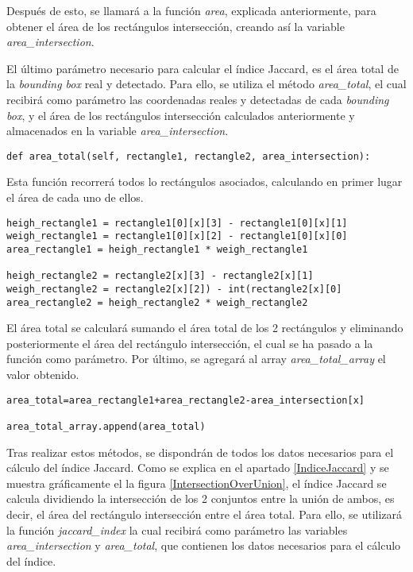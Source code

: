 \documentclass[a4paper, 12pt, oneside]{book}
\begin{document}
Después de esto, se llamará a la función \textit{area}, explicada anteriormente, para obtener el área de los rectángulos intersección, creando así la variable \textit{area\_intersection}.

El último parámetro necesario para calcular el índice Jaccard, es el área total de la \textit{bounding box} real y detectado. Para ello, se utiliza el método \textit{area\_total}, el cual recibirá como parámetro las coordenadas reales y detectadas de cada \textit{bounding box}, y el área de los rectángulos intersección calculados anteriormente y almacenados en la variable \textit{area\_intersection}.\\

\begin{lstlisting}[frame=single]
def area_total(self, rectangle1, rectangle2, area_intersection):
\end{lstlisting}

Esta función recorrerá todos lo rectángulos asociados, calculando en primer lugar el área de cada uno de ellos.\\

\begin{lstlisting}[frame=single]
heigh_rectangle1 = rectangle1[0][x][3] - rectangle1[0][x][1]
weigh_rectangle1 = rectangle1[0][x][2] - rectangle1[0][x][0]
area_rectangle1 = heigh_rectangle1 * weigh_rectangle1

heigh_rectangle2 = rectangle2[x][3] - rectangle2[x][1]
weigh_rectangle2 = rectangle2[x][2]) - int(rectangle2[x][0]
area_rectangle2 = heigh_rectangle2 * weigh_rectangle2
\end{lstlisting}

El área total se calculará sumando el área total de los 2 rectángulos y eliminando posteriormente el área del rectángulo intersección, el cual se ha pasado a la función como parámetro. Por último, se agregará al array \textit{area\_total\_array} el valor obtenido.\\

\begin{lstlisting}[frame=single]
area_total=area_rectangle1+area_rectangle2-area_intersection[x]

area_total_array.append(area_total)
\end{lstlisting}

Tras realizar estos métodos, se dispondrán de todos los datos necesarios para el cálculo del índice Jaccard. Como se explica en el apartado \ref{IndiceJaccard} y se muestra gráficamente el la figura \ref{IntersectionOverUnion}, el índice Jaccard se calcula dividiendo la intersección de los 2 conjuntos entre la unión de ambos, es decir, el área del rectángulo intersección entre el área total. Para ello, se utilizará la función \textit{jaccard\_index} la cual recibirá como parámetro las variables \textit{area\_intersection} y \textit{area\_total}, que contienen los datos necesarios para el cálculo del índice.\\
\end{document}

